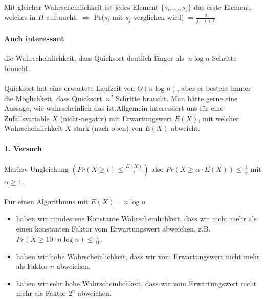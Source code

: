 
\paragraph*{} Mit gleicher Wahrscheinlichkeit ist jedes Element $\{ s_i,\dots,s_j \}$ das erste Element, welches in $\Pi$ auftaucht. $\Rightarrow$ Pr($s_i$ mit $s_j$ verglichen wird) $= \frac{2}{j-i+1}$

\paragraph*{Auch interessant} die Wahrscheinlichkeit, dass Quicksort deutlich länger als $~n \log n$ Schritte braucht.


\paragraph*{} Quicksort hat eine erwartete Laufzeit von $O(n \log n)$, aber er besteht immer die Möglichkeit, dass Quicksort $~n^2$ Schritte braucht. Man hätte gerne eine Aussage, wie wahrscheinlich das ist.Allgemein interessiert uns für eine Zufallsvariable $X$ (nicht-negativ) mit Erwartungswert $E(X)$, mit welcher Wahrscheinlichkeit $X$ stark (nach oben) von $E(X)$ abweicht. %

\paragraph*{1. Versuch} Markov Ungleichung $(Pr(X \geq t) \leq \frac{E(X)}{t})$ also $Pr(X \geq \alpha \cdot E(X)) \leq \frac{1}{\alpha}$ mit $\alpha \geq 1$.

\paragraph*{} Für einen Algorithmus mit $E(X) = n \log n$
\begin{itemize}
	\item haben wir mindestens Konstante Wahrscheinlichkeit, dass wir nicht mehr als einen konstanten Faktor vom Erwartungswert abweichen, z.B. $Pr(X \geq 10 \cdot n \log n) \leq \frac{1}{10}$.
	\item haben wir \underline{hohe} Wahrscheinlichkeit, dass wir vom Erwartungswert nicht mehr als Faktor $n$ abweichen.
	\item haben wir \underline{sehr hohe} Wahrscheinlichkeit, dass wir vom Erwartungswert nicht mehr als Faktor $2^n$ abweichen.
\end{itemize}

